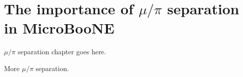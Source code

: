 \chapter{The importance of $\mu/\pi$ separation in MicroBooNE}
$\mu/\pi$ separation chapter goes here.

\clearpage

More $\mu/\pi$ separation.
